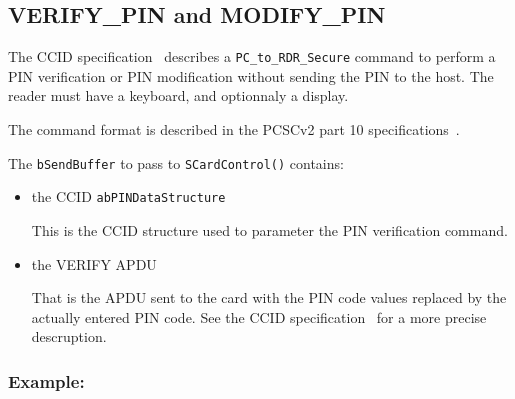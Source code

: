 \documentclass[a4paper,12pt]{article}
\newcommand{\example}{\subsubsection{Example:}}
\begin{document}
\subsection{VERIFY\_PIN and MODIFY\_PIN}

The CCID specification~\cite{ccid_spec} describes a
\texttt{PC\_to\_RDR\_Secure} command to perform a PIN verification or
PIN modification without sending the PIN to the host. The reader must
have a keyboard, and optionnaly a display.

The command format is described in the PCSCv2 part 10
specifications~\cite{pcsc_v2_part10}.

The \texttt{bSendBuffer} to pass to \texttt{SCardControl()} contains:
\begin{itemize}
\item the CCID \texttt{abPINDataStructure}

This is the CCID structure used to parameter the PIN verification
command.

\item the VERIFY APDU

That is the APDU sent to the card with the PIN code values replaced by
the actually entered PIN code. See the CCID
specification~\cite{ccid_spec} for a more precise descruption.

\end{itemize}

\example
\end{document}
